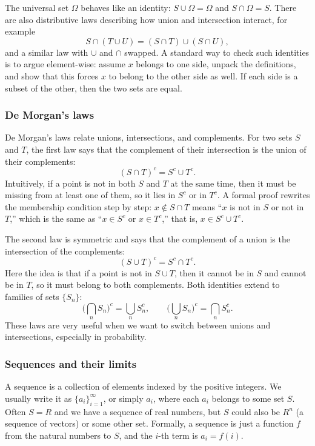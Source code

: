 The universal set \(\Omega\) behaves like an identity: \(S \cup \Omega = \Omega\) and \(S \cap \Omega = S\). There are also distributive laws describing how union and intersection interact, for example
\[
S \cap (T \cup U) = (S \cap T) \cup (S \cap U),
\]
and a similar law with \(\cup\) and \(\cap\) swapped. A standard way to check such identities is to argue element-wise: assume \(x\) belongs to one side, unpack the definitions, and show that this forces \(x\) to belong to the other side as well. If each side is a subset of the other, then the two sets are equal.

\subsubsection{De Morgan's laws}

De Morgan's laws relate unions, intersections, and complements. For two sets \(S\) and \(T\), the first law says that the complement of their intersection is the union of their complements:
\[
(S \cap T)^c = S^c \cup T^c.
\]
Intuitively, if a point is not in both \(S\) and \(T\) at the same time, then it must be missing from at least one of them, so it lies in \(S^c\) or in \(T^c\). A formal proof rewrites the membership condition step by step: \(x \notin S \cap T\) means “\(x\) is not in \(S\) or not in \(T\),” which is the same as “\(x \in S^c\) or \(x \in T^c\),” that is, \(x \in S^c \cup T^c\).

The second law is symmetric and says that the complement of a union is the intersection of the complements:
\[
(S \cup T)^c = S^c \cap T^c.
\]
Here the idea is that if a point is not in \(S \cup T\), then it cannot be in \(S\) and cannot be in \(T\), so it must belong to both complements. Both identities extend to families of sets \(\{S_n\}\):
\[
\Big(\bigcap_{n} S_n\Big)^c = \bigcup_{n} S_n^c,
\qquad
\Big(\bigcup_{n} S_n\Big)^c = \bigcap_{n} S_n^c.
\]
These laws are very useful when we want to switch between unions and intersections, especially in probability.
\subsubsection{Sequences and their limits}

A sequence is a collection of elements indexed by the positive integers. We usually write it as \(\{a_i\}_{i=1}^\infty\), or simply \(a_i\), where each \(a_i\) belongs to some set \(S\). Often \(S = {R}\) and we have a sequence of real numbers, but \(S\) could also be \({R}^n\) (a sequence of vectors) or some other set. Formally, a sequence is just a function \(f\) from the natural numbers to \(S\), and the \(i\)-th term is \(a_i = f(i)\).

